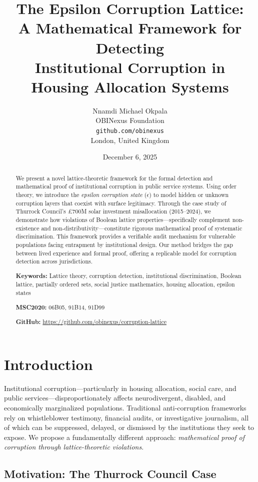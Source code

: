 \documentclass[11pt,a4paper]{article}
\title{The Epsilon Corruption Lattice: \\
\large A Mathematical Framework for Detecting \\
Institutional Corruption in Housing Allocation Systems}
\author{Nnamdi Michael Okpala \\
OBINexus Foundation \\
\texttt{github.com/obinexus} \\
London, United Kingdom}
\date{December 6, 2025}
\theoremstyle{definition}
\begin{document}
\maketitle

\begin{abstract}
We present a novel lattice-theoretic framework for the formal detection and mathematical proof of institutional corruption in public service systems. Using order theory, we introduce the \emph{epsilon corruption state} ($\epsilon$) to model hidden or unknown corruption layers that coexist with surface legitimacy. Through the case study of Thurrock Council's £700M solar investment misallocation (2015--2024), we demonstrate how violations of Boolean lattice properties—specifically complement non-existence and non-distributivity—constitute rigorous mathematical proof of systematic discrimination. This framework provides a verifiable audit mechanism for vulnerable populations facing entrapment by institutional design. Our method bridges the gap between lived experience and formal proof, offering a replicable model for corruption detection across jurisdictions.

\noindent\textbf{Keywords:} Lattice theory, corruption detection, institutional discrimination, Boolean lattice, partially ordered sets, social justice mathematics, housing allocation, epsilon states

\noindent\textbf{MSC2020:} 06B05, 91B14, 91D99

\noindent\textbf{GitHub:} \url{https://github.com/obinexus/corruption-lattice}
\end{abstract}

\section{Introduction}

Institutional corruption—particularly in housing allocation, social care, and public services—disproportionately affects neurodivergent, disabled, and economically marginalized populations. Traditional anti-corruption frameworks rely on whistleblower testimony, financial audits, or investigative journalism, all of which can be suppressed, delayed, or dismissed by the institutions they seek to expose. We propose a fundamentally different approach: \emph{mathematical proof of corruption through lattice-theoretic violations}.

\subsection{Motivation: The Thurrock Council Case}
\end{document}
